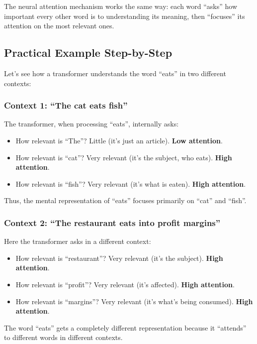 The neural attention mechanism works the same way: each word ``asks'' how important every other word is to understanding its meaning, then ``focuses'' its attention on the most relevant ones.

\subsection{Practical Example Step-by-Step}

Let's see how a transformer understands the word ``eats'' in two different contexts:

\subsubsection{Context 1: ``The cat eats fish''}

The transformer, when processing ``eats'', internally asks:
\begin{itemize}[leftmargin=*]
    \item How relevant is ``The''? Little (it's just an article). \textbf{Low attention}.
    \item How relevant is ``cat''? Very relevant (it's the subject, who eats). \textbf{High attention}.
    \item How relevant is ``fish''? Very relevant (it's what is eaten). \textbf{High attention}.
\end{itemize}

Thus, the mental representation of ``eats'' focuses primarily on ``cat'' and ``fish''.

\subsubsection{Context 2: ``The restaurant eats into profit margins''}

Here the transformer asks in a different context:
\begin{itemize}[leftmargin=*]
    \item How relevant is ``restaurant''? Very relevant (it's the subject). \textbf{High attention}.
    \item How relevant is ``profit''? Very relevant (it's affected). \textbf{High attention}.
    \item How relevant is ``margins''? Very relevant (it's what's being consumed). \textbf{High attention}.
\end{itemize}

The word ``eats'' gets a completely different representation because it ``attends'' to different words in different contexts.


